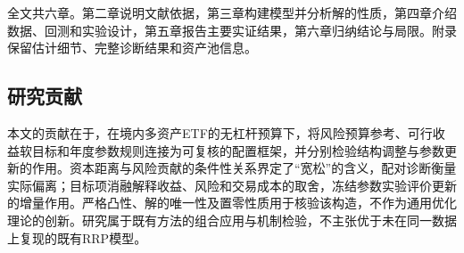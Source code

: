 全文共六章。第二章说明文献依据，第三章构建模型并分析解的性质，第四章介绍数据、回测和实验设计，第五章报告主要实证结果，第六章归纳结论与局限。附录保留估计细节、完整诊断结果和资产池信息。

\subsection{研究贡献}
本文的贡献在于，在境内多资产ETF的无杠杆预算下，将风险预算参考、可行收益软目标和年度参数规则连接为可复核的配置框架，并分别检验结构调整与参数更新的作用。资本距离与风险贡献的条件性关系界定了“宽松”的含义，配对诊断衡量实际偏离；目标项消融解释收益、风险和交易成本的取舍，冻结参数实验评价更新的增量作用。严格凸性、解的唯一性及置零性质用于核验该构造，不作为通用优化理论的创新。研究属于既有方法的组合应用与机制检验，不主张优于未在同一数据上复现的既有RRP模型。
